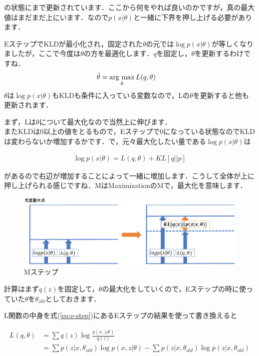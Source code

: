 \documentclass[11pt,a4paper]{ujreport}
\newcommand{\argmax}{\mathop{\rm arg~max}\limits}
\begin{document}
の状態にまで更新されています．ここから何をやれば良いのかですが，真の最大値はまだまだ上にいます．なので$p(x|\theta)$と一緒に下界を押し上げる必要があります．

EステップでKLDが最小化され，固定された$\theta$の元では$\log p(x|\theta)$が等しくなりましたが，ここで今度は$\theta$の方を最適化します．$q$を固定し，$\theta$を更新するわけですね．\\

\begin{align}
  \hat{\theta} &= \argmax_{\theta}L(q,\theta)
\end{align}
$\theta$は$\log p(x|\theta)$もKLDも条件に入っている変数なので，Lの$\theta$を更新すると他も更新されます．

まず，Lは$\theta$について最大化なので当然上に伸びます．\\

またKLDは0以上の値をとるもので，Eステップで0になっている状態なのでKLDは変わらないか増加するかです．で，元々最大化したい量である$\log p(x|\theta)$は

\begin{align}
  \log p(x|\theta) = L(q,\theta) + KL[q||p]\nonumber
\end{align}

があるので右辺が増加することによって一緒に増加します．こうして全体が上に押し上げられる感じですね．MはMaximizationのMで，最大化を意味します．

\begin{figure}[H]
  \label{im:em4}
  \centering
  \includegraphics[width=15cm]{../figures/em4.eps}
  \caption{Mステップ}
\end{figure}


計算はまず$q(z)$を固定して，$\theta$の最大化をしていくので，Eステップの時に使っていた$\theta$を$\theta_{old}$としておきます．

L関数の中身を式(\ref{eq:e-step})にあるEステップの結果を使って書き換えると

\begin{align}
  L(q,\theta) &= \sum q(z) \log \frac{p(x,z|\theta)}{q(z)}\\
  &= \sum p(z|x,\theta_{old})\log p(x,z|\theta) - \sum p(z|x,\theta_{old})\log p(z|x,\theta_{old})
\end{align}
\end{document}
